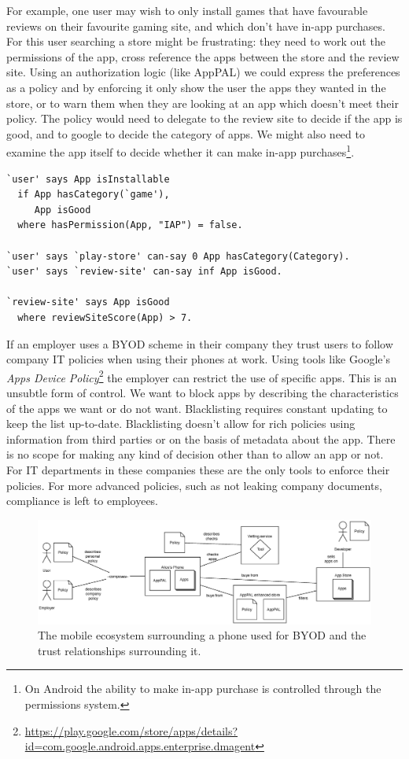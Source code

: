 \documentclass[a4paper]{scrartcl}
\begin{document}
For example, one user may wish to only install games that have favourable reviews on their favourite gaming site, and which don't have in-app purchases.
For this user searching a store might be frustrating: they need to work out the permissions of the app, cross reference the apps between the store and the review site.
Using an authorization logic (like AppPAL) we could express the preferences as a policy and by enforcing it only show the user the apps they wanted in the store, or to warn them when they are looking at an app which doesn't meet their policy.
The policy would need to delegate to the review site to decide if the app is good, and to google to decide the category of apps.
We might also need to examine the app itself to decide whether it can make in-app purchases\footnote{On Android the ability to make in-app purchase is controlled through the permissions system.}.
\begin{lstlisting}
`user' says App isInstallable
  if App hasCategory(`game'),
     App isGood
  where hasPermission(App, "IAP") = false.

`user' says `play-store' can-say 0 App hasCategory(Category).
`user' says `review-site' can-say inf App isGood.

`review-site' says App isGood
  where reviewSiteScore(App) > 7.
\end{lstlisting}

If an employer uses a \ac{BYOD} scheme in their company they trust users to follow company IT policies when using their phones at work.
Using tools like Google's \emph{Apps Device Policy}\footnote{\url{https://play.google.com/store/apps/details?id=com.google.android.apps.enterprise.dmagent}} the employer can restrict the use of specific apps.
This is an unsubtle form of control.
We want to block apps by describing the characteristics of the apps we want or do not want.
Blacklisting requires constant updating to keep the list up-to-date.
Blacklisting doesn't allow for rich policies using information from third parties or on the basis of metadata about the app.
There is no scope for making any kind of decision other than to allow an app or not.
For IT departments in these companies these are the only tools to enforce their policies.
For more advanced policies, such as not leaking company documents, compliance is left to employees.

\begin{figure}[]
  \centering
  \includegraphics[width=1.0\linewidth]{images/ecosystem.eps}
  \caption{The mobile ecosystem surrounding a phone used for \ac{BYOD} and the trust relationships surrounding it.}
  \label{fig:ecosystem}
\end{figure}
\end{document}
